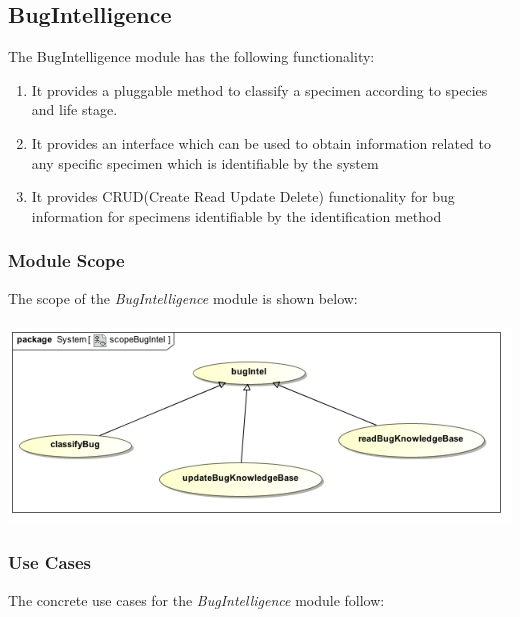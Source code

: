 \documentclass[11pt,a4paper,titlepage]{article}
\begin{document}
	\subsection{BugIntelligence}
		The BugIntelligence module has the following functionality:
		\begin{enumerate}		
			\item It provides a pluggable method to classify a specimen according to species and life stage.
			\item It provides an interface which can be used to obtain information related to any specific specimen which is identifiable by the system
			\item It provides CRUD(Create Read Update Delete) functionality for bug information for specimens identifiable by the identification method
		\end{enumerate}
		\subsubsection{Module Scope}
		The scope of the \textit{BugIntelligence} module is shown below:\\
		\hfill\\
		\includegraphics[width=\linewidth]{scopeBugIntel}
		\subsubsection{Use Cases}
		The concrete use cases for the \textit{BugIntelligence} module follow:
		
\end{document}
